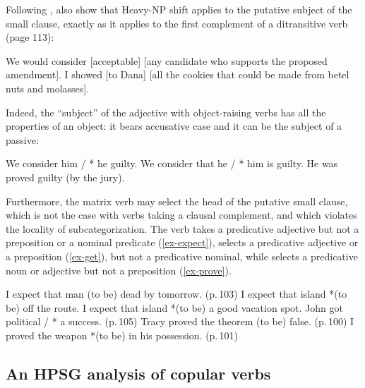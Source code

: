 \documentclass[output=paper
                ,modfonts
                ,nonflat
	        ,collection
	        ,collectionchapter
	        ,collectiontoclongg
 	        ,biblatex
                ,babelshorthands
                ,newtxmath
                ,draftmode
                ,colorlinks, citecolor=brown
]{./langsci/langscibook}
\begin{document}
Following \citet{Bresnan1982}, \citet[113]{PollardandSag1994} also show that Heavy-NP shift applies to the putative subject of the small clause, exactly as it applies to the first complement of a ditransitive verb (page 113):

\begin{exe}
\ex \begin{xlist}
\ex   We would consider [acceptable]  [any candidate who supports the proposed amendment].
\ex   I showed [to Dana]  [all the cookies that could be made from betel nuts and molasses].  
\end{xlist}

\end{exe}

 Indeed, the ``subject'' of the adjective with object-raising verbs has all the properties of an
 object: it bears accusative case and it can be the subject of a passive:

\begin{exe}
\ex \begin{xlist}
\ex We consider him / * he guilty.
\ex 	We consider that he / * him is guilty.
\ex 	He was proved guilty (by the jury).	
\end{xlist}
\end{exe}
	

Furthermore, the matrix verb may select the head of the putative small clause, which is not the case
with verbs taking a clausal complement, and which violates the locality of subcategorization. The
verb  takes a predicative adjective but not a preposition or a nominal predicate (\ref{ex-expect}),
 selects a predicative adjective or a preposition (\ref{ex-get}), but not a predicative nominal, while
 selects a predicative noun or adjective but not a preposition (\ref{ex-prove}).


\eal
\label{ex-expect}
\ex I expect that man (to be) dead  by tomorrow. (p.\,103)
\ex I expect that island *(to be) off the route.
\ex I expect that island *(to be) a good vacation spot.
\zl
\ea
\label{ex-get}
John got political / * a success. (p.\,105)	
\z
\eal
\label{ex-prove}
\ex Tracy proved the theorem (to be) false. (p.\,100)
\ex I proved the weapon *(to be) in his possession.	(p.\,101)
\zl
	


\subsection{An HPSG analysis of copular verbs}
\label{control-sec-copula-verbs}
	
\end{document}
